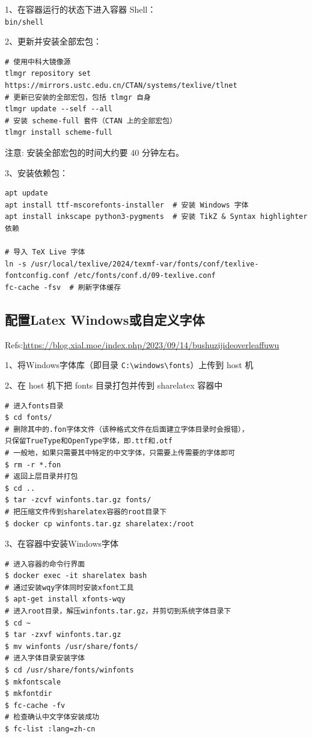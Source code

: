 1、在容器运行的状态下进入容器 Shell：\\
\verb|bin/shell|

2、更新并安装全部宏包：
\begin{verbatim}
# 使用中科大镜像源
tlmgr repository set https://mirrors.ustc.edu.cn/CTAN/systems/texlive/tlnet
# 更新已安装的全部宏包，包括 tlmgr 自身
tlmgr update --self --all
# 安装 scheme-full 套件（CTAN 上的全部宏包）
tlmgr install scheme-full
\end{verbatim}
注意: 安装全部宏包的时间大约要 40 分钟左右。

3、安装依赖包：
{\tiny
\begin{verbatim}
apt update
apt install ttf-mscorefonts-installer  # 安装 Windows 字体
apt install inkscape python3-pygments  # 安装 TikZ & Syntax highlighter 依赖

# 导入 TeX Live 字体
ln -s /usr/local/texlive/2024/texmf-var/fonts/conf/texlive-fontconfig.conf /etc/fonts/conf.d/09-texlive.conf
fc-cache -fsv  # 刷新字体缓存
\end{verbatim}
}


\subsection{配置Latex Windows或自定义字体}
Refs:\url{https://blog.xial.moe/index.php/2023/09/14/bushuzijideoverleaffuwu}

1、将Windows字体库（即目录 \verb|C:\windows\fonts|）上传到 host 机

2、在 host 机下把 fonts 目录打包并传到 sharelatex 容器中
\begin{verbatim}
# 进入fonts目录
$ cd fonts/
# 删除其中的.fon字体文件（该种格式文件在后面建立字体目录时会报错），
只保留TrueType和OpenType字体，即.ttf和.otf
# 一般地，如果只需要其中特定的中文字体，只需要上传需要的字体即可
$ rm -r *.fon
# 返回上层目录并打包
$ cd ..
$ tar -zcvf winfonts.tar.gz fonts/
# 把压缩文件传到sharelatex容器的root目录下
$ docker cp winfonts.tar.gz sharelatex:/root
\end{verbatim}

3、在容器中安装Windows字体
\begin{verbatim}
# 进入容器的命令行界面
$ docker exec -it sharelatex bash
# 通过安装wqy字体同时安装xfont工具
$ apt-get install xfonts-wqy
# 进入root目录，解压winfonts.tar.gz，并剪切到系统字体目录下
$ cd ~
$ tar -zxvf winfonts.tar.gz
$ mv winfonts /usr/share/fonts/
# 进入字体目录安装字体
$ cd /usr/share/fonts/winfonts
$ mkfontscale
$ mkfontdir
$ fc-cache -fv
# 检查确认中文字体安装成功
$ fc-list :lang=zh-cn
\end{verbatim}

